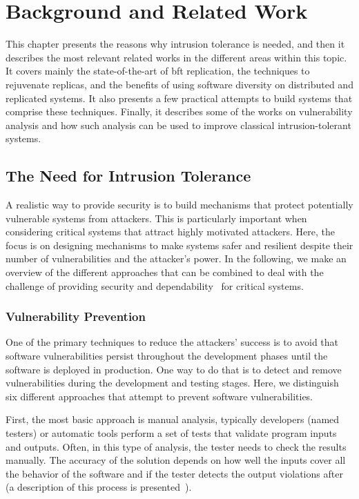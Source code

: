 \chapter{Background and Related Work}
\label{chap:related_work}


This chapter presents the reasons why intrusion tolerance is needed, and then it describes the most relevant related works in the different areas within this topic.
It covers mainly the state-of-the-art of \gls{bft} replication, the techniques to rejuvenate replicas, and the benefits of using software diversity on distributed and replicated systems.
It also presents a few practical attempts to build systems that comprise these techniques.
Finally, it describes some of the works on vulnerability analysis and how such analysis can be used to improve classical intrusion-tolerant systems.


\section{The Need for Intrusion Tolerance}
A realistic way to provide security is to build mechanisms that protect potentially vulnerable systems from attackers.
This is particularly important when considering critical systems that attract highly motivated attackers. 
Here, the focus is on designing mechanisms to make systems safer and resilient despite their number of vulnerabilities and the attacker's power.
In the following, we make an overview of the different approaches that can be combined to deal with the challenge of providing security and dependability~\cite{Avizienis:2004} for critical systems.

\subsection{Vulnerability Prevention}
One of the primary techniques to reduce the attackers' success is to avoid that software vulnerabilities persist throughout the development phases until the software is deployed in production. 
One way to do that is to detect and remove vulnerabilities during the development and testing stages.
Here, we distinguish six different approaches that attempt to prevent software vulnerabilities. 

First, the most basic approach is manual analysis, typically developers (named testers) or automatic tools perform a set of tests that validate program inputs and outputs.
Often, in this type of analysis, the tester needs to check the results manually. 
The accuracy of the solution depends on how well the inputs cover all the behavior of the software and if the tester detects the output violations after (a description of this process is presented~\cite{Votipka:2018}).


